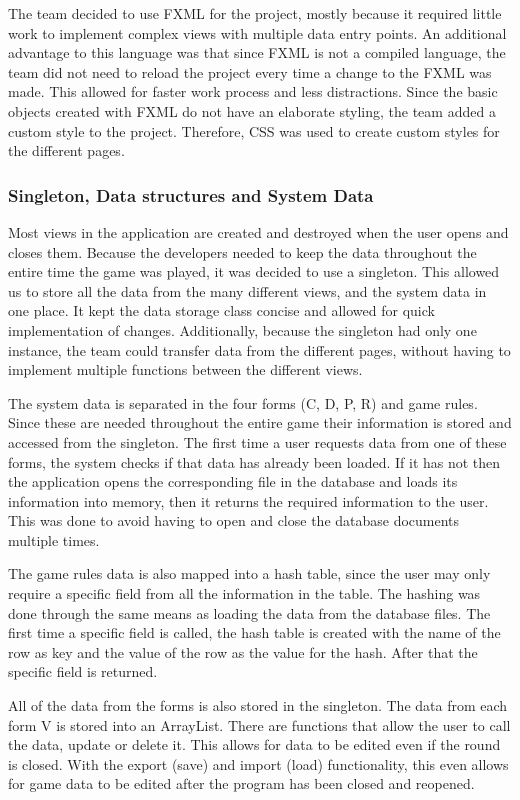 \documentclass{l3proj}
\begin{document}
The team decided to use FXML for the project, mostly because it required little work to implement complex views with multiple data entry points. An additional advantage to this language was that since FXML is not a compiled language, the team did not need to reload the project every time a change to the FXML was made. This allowed for faster work process and less distractions. Since the basic objects created with FXML do not have an elaborate styling, the team added a custom style to the project. Therefore, CSS was used to create custom styles for the different pages.

\subsubsection{Singleton, Data structures and System Data}
Most views in the application are created and destroyed when the user opens and closes them. Because the developers needed to keep the data throughout the entire time the game was played, it was decided to use a singleton. This allowed us to store all the data from the many different views, and the system data in one place. It kept the data storage class concise and allowed for quick implementation of changes. Additionally, because the singleton had only one instance, the team could transfer data from the different pages, without having to implement multiple functions between the different views.
 
The system data is separated in the four forms (C, D, P, R) and game rules. Since these are needed throughout the entire game their information is stored and accessed from the singleton. The first time a user requests data from one of these forms, the system checks if that data has already been loaded. If it has not then the application opens the corresponding file in the database and loads its information into memory, then it returns the required information to the user. This was done to avoid having to open and close the database documents multiple times.

The game rules data is also mapped into a hash table, since the user may only require a specific field from all the information in the table. The hashing was done through the same means as loading the data from the database files. The first time a specific field is called, the hash table is created with the name of the row as key and the value of the row as the value for the hash. After that the specific field is returned.

All of the data from the forms is also stored in the singleton. The data from each form V is stored into an ArrayList. There are functions that allow the user to call the data, update or delete it. This allows for data to be edited even if the round is closed. With the export (save) and import (load) functionality, this even allows for game data to be edited after the program has been closed and reopened.
\end{document}
